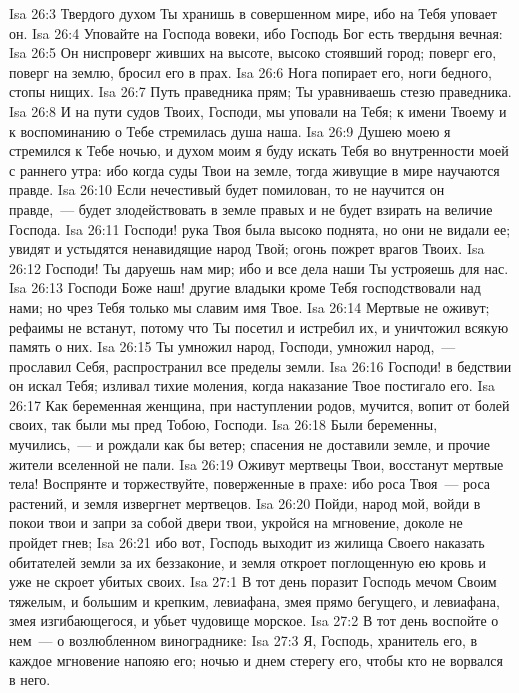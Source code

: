 \vs Isa 26:3 Твердого духом Ты хранишь в совершенном мире, ибо на Тебя уповает он.
\vs Isa 26:4 Уповайте на Господа вовеки, ибо Господь Бог есть твердыня вечная:
\vs Isa 26:5 Он ниспроверг живших на высоте, высоко стоявший город; поверг его, поверг на землю, бросил его в прах.
\vs Isa 26:6 Нога попирает его, ноги бедного, стопы нищих.
\vs Isa 26:7 Путь праведника прям; Ты уравниваешь стезю праведника.
\vs Isa 26:8 И на пути судов Твоих, Господи, мы уповали на Тебя; к имени Твоему и к воспоминанию о Тебе стремилась душа наша.
\vs Isa 26:9 Душею моею я стремился к Тебе ночью, и духом моим я буду искать Тебя во внутренности моей с раннего утра: ибо когда суды Твои  на земле, тогда живущие в мире научаются правде.
\vs Isa 26:10 Если нечестивый будет помилован, то не научится он правде,~--- будет злодействовать в земле правых и не будет взирать на величие Господа.
\vs Isa 26:11 Господи! рука Твоя была высоко поднята, но они не видали ее; увидят и устыдятся ненавидящие народ Твой; огонь пожрет врагов Твоих.
\vs Isa 26:12 Господи! Ты даруешь нам мир; ибо и все дела наши Ты устрояешь для нас.
\vs Isa 26:13 Господи Боже наш! другие владыки кроме Тебя господствовали над нами; но чрез Тебя только мы славим имя Твое.
\vs Isa 26:14 Мертвые не оживут; рефаимы не встанут, потому что Ты посетил и истребил их, и уничтожил всякую память о них.
\vs Isa 26:15 Ты умножил народ, Господи, умножил народ,~--- прославил Себя, распространил все пределы земли.
\vs Isa 26:16 Господи! в бедствии он искал Тебя; изливал тихие моления, когда наказание Твое постигало его.
\vs Isa 26:17 Как беременная женщина, при наступлении родов, мучится, вопит от болей своих, так были мы пред Тобою, Господи.
\vs Isa 26:18 Были беременны, мучились,~--- и рождали как бы ветер; спасения не доставили земле, и прочие жители вселенной не пали.
\vs Isa 26:19 Оживут мертвецы Твои, восстанут мертвые тела! Воспрянте и торжествуйте, поверженные в прахе: ибо роса Твоя~--- роса растений, и земля извергнет мертвецов.
\vs Isa 26:20 Пойди, народ мой, войди в покои твои и запри за собой двери твои, укройся на мгновение, доколе не пройдет гнев;
\vs Isa 26:21 ибо вот, Господь выходит из жилища Своего наказать обитателей земли за их беззаконие, и земля откроет поглощенную ею кровь и уже не скроет убитых своих.
\vs Isa 27:1 В тот день поразит Господь мечом Своим тяжелым, и большим и крепким, левиафана, змея прямо бегущего, и левиафана, змея изгибающегося, и убьет чудовище морское.
\vs Isa 27:2 В тот день воспойте о нем~--- о возлюбленном винограднике:
\vs Isa 27:3 Я, Господь, хранитель его, в каждое мгновение напояю его; ночью и днем стерегу его, чтобы кто не ворвался в него.
